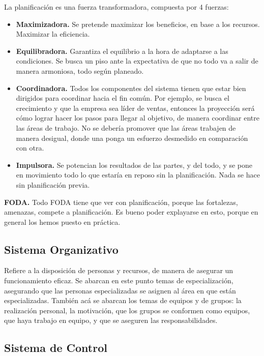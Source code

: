 La planificación es una fuerza transformadora, compuesta por 4 fuerzas:
\begin{itemize}
\item \textbf{Maximizadora.} Se pretende maximizar los beneficios, en base a
los recursos. Maximizar la eficiencia. 
\item \textbf{Equilibradora.}
Garantiza el equilibrio a la hora de adaptarse a las condiciones. Se
busca un piso ante la expectativa de que no todo va a salir de manera
armoniosa, todo según planeado. 
\item \textbf{Coordinadora.} Todos los
componentes del sistema tienen que estar bien dirigidos para coordinar
hacia el fin común. Por ejemplo, se busca el crecimiento y que la
empresa sea líder de ventas, entonces la proyección será cómo lograr
hacer los pasos para llegar al objetivo, de manera coordinar entre las
áreas de trabajo. No se debería promover que las áreas trabajen de
manera desigual, donde una ponga un esfuerzo desmedido en comparación
con otra.
\item \textbf{Impulsora.} Se potencian los resultados de las
partes, y del todo, y se pone en movimiento todo lo que estaría en
reposo sin la planificación. Nada se hace sin planificación previa.
\end{itemize}

\textbf{FODA.} Todo FODA tiene que ver con planificación, porque las
fortalezas, amenazas, compete a planificación. Es bueno poder explayarse
en esto, porque en general los hemos puesto en práctica.

\hypertarget{sistema-organizativo}{%
\subsection{Sistema Organizativo}\label{sistema-organizativo}}

Refiere a la disposición de personas y recursos, de manera de asegurar
un funcionamiento eficaz. Se abarcan en este punto temas de
especialización, asegurando que las personas especializadas se asignen
al área en que están especializadas. También acá se abarcan los temas de
equipos y de grupos: la realización personal, la motivación, que los
grupos se conformen como equipos, que haya trabajo en equipo, y que se
aseguren las responsabilidades.

\hypertarget{sistema-de-control}{%
\subsection{Sistema de Control}\label{sistema-de-control}}

